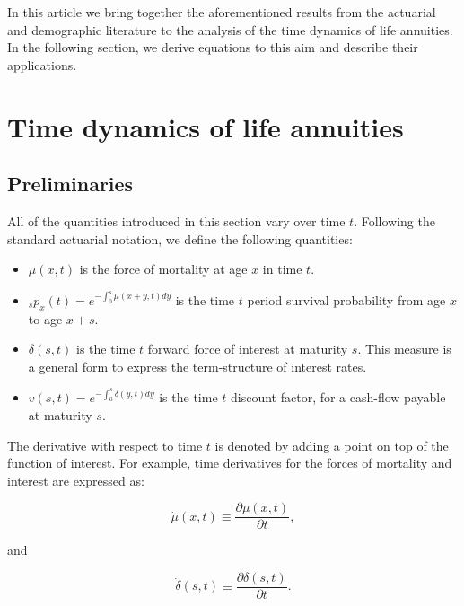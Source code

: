 \documentclass[12pt]{article}
\begin{document}
In this article we bring together the aforementioned results from the actuarial and demographic literature to the analysis of the time dynamics of life annuities. In the following section, we derive equations to this aim and describe their applications.

\section{Time dynamics of life annuities}\label{sec:3_timedynamics}
\subsection{Preliminaries}\label{preliminaries}

All of the quantities introduced in this section vary over time $t$. Following the standard actuarial notation, we define the following quantities:

\begin{itemize}

\item
\(\mu(x,t)\) is the force of mortality at age \(x\) in time $t$.

\item
$_sp_x(t)=e^{-\int_{0}^{s}\mu(x+y,t)dy}$ is the time $t$ period survival probability from age \(x\) to age \(x+s\). 


\item
\(\delta(s,t)\) is the time $t$ forward force of interest at maturity $s$. This measure is a general form to express the term-structure of interest rates.

\item 

${v}(s,t)=e^{-\int_{0}^{s}\delta(y,t)dy}$ is the time $t$ discount factor, for a cash-flow payable at maturity $s$.

\end{itemize}

The derivative with respect to time $t$ is denoted by adding a point on top of the function of interest. For example, time derivatives for the forces of mortality and interest are expressed as:

\begin{equation} \label{eq:mudot}
\dot{\mu}(x,t)\equiv\frac{\partial\mu(x,t)}{\partial t},
\end{equation}

and 

\begin{equation} \label{eq:mudot}
\dot{\delta}(s,t)\equiv\frac{\partial\delta(s,t)}{\partial t}.
\end{equation}
\end{document}
